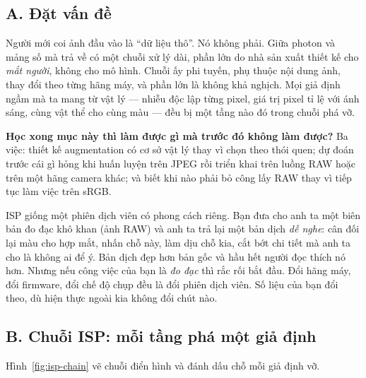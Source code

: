 \documentclass[../../../deep_learning.tex]{subfiles}
\begin{document}
\subsection{A. Đặt vấn đề}
Người mới coi ảnh đầu vào là ``dữ liệu thô''. Nó không phải. Giữa photon và mảng số mà  trả về có một chuỗi xử lý dài, phần lớn do nhà sản xuất thiết kế cho \emph{mắt người}, không cho mô hình. Chuỗi ấy phi tuyến, phụ thuộc nội dung ảnh, thay đổi theo từng hãng máy, và phần lớn là không khả nghịch. Mọi giả định ngầm mà ta mang từ vật lý --- nhiễu độc lập từng pixel, giá trị pixel tỉ lệ với ánh sáng, cùng vật thể cho cùng màu --- đều bị một tầng nào đó trong chuỗi phá vỡ.

\textbf{Học xong mục này thì làm được gì mà trước đó không làm được?} Ba việc: thiết kế augmentation có cơ sở vật lý thay vì chọn theo thói quen; dự đoán trước cái gì hỏng khi huấn luyện trên JPEG rồi triển khai trên luồng RAW hoặc trên một hãng camera khác; và biết khi nào phải bỏ công lấy RAW thay vì tiếp tục làm việc trên sRGB.

\begin{trucgiac}
ISP giống một phiên dịch viên có phong cách riêng. Bạn đưa cho anh ta một biên bản đo đạc khô khan (ảnh RAW) và anh ta trả lại một bản dịch \emph{dễ nghe}: cân đối lại màu cho hợp mắt, nhấn chỗ này, làm dịu chỗ kia, cắt bớt chi tiết mà anh ta cho là không ai để ý. Bản dịch đẹp hơn bản gốc và hầu hết người đọc thích nó hơn. Nhưng nếu công việc của bạn là \emph{đo đạc} thì rắc rối bắt đầu. Đổi hãng máy, đổi firmware, đổi chế độ chụp đều là đổi phiên dịch viên. Số liệu của bạn đổi theo, dù hiện thực ngoài kia không đổi chút nào.
\end{trucgiac}

\subsection{B. Chuỗi ISP: mỗi tầng phá một giả định}
Hình~\ref{fig:isp-chain} vẽ chuỗi điển hình và đánh dấu chỗ mỗi giả định vỡ.
\end{document}
